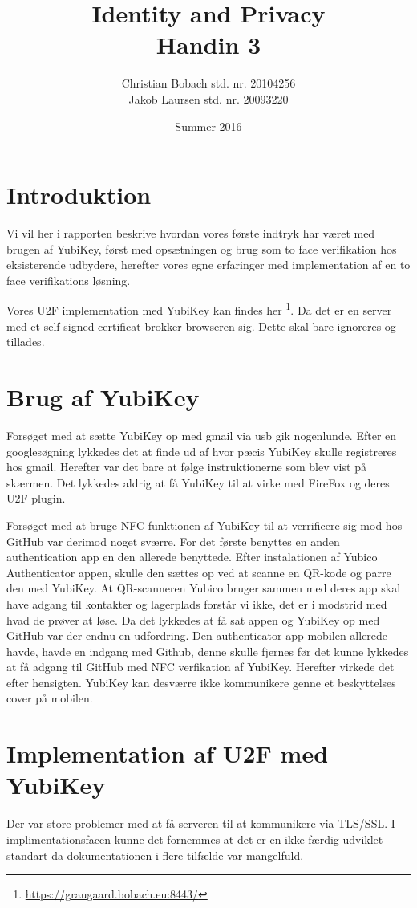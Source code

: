 \documentclass[a4paper,12pt]{article}
\title{Identity and Privacy \\Handin 3}
\author{Christian Bobach std. nr. 20104256\\Jakob Laursen std. nr. 20093220}
\date{Summer 2016}
\theoremstyle{plain}
\theoremstyle{nonumberplain}
\begin{document}
\maketitle
\section*{Introduktion}
Vi vil her i rapporten beskrive hvordan vores første indtryk har været med brugen af YubiKey, først med opsætningen og brug som to face verifikation hos eksisterende udbydere, herefter vores egne erfaringer med implementation af en to face verifikations løsning.

Vores U2F implementation med YubiKey kan findes her \footnote{\url{https://graugaard.bobach.eu:8443/}}. Da det er en server med et self signed certificat brokker browseren sig. Dette skal bare ignoreres og tillades.

\section*{Brug af YubiKey}
Forsøget med at sætte YubiKey op med gmail via usb gik nogenlunde. Efter en googlesøgning lykkedes det at finde ud af hvor pæcis YubiKey skulle registreres hos gmail. Herefter var det bare at følge instruktionerne som blev vist på skærmen. Det lykkedes aldrig at få YubiKey til at virke med FireFox og deres U2F plugin.

Forsøget med at bruge NFC funktionen af YubiKey til at verrificere sig mod hos GitHub var derimod noget sværre. For det første benyttes en anden authentication app en den allerede benyttede. Efter instalationen af Yubico Authenticator appen, skulle den sættes op ved at scanne en QR-kode og parre den med YubiKey. At QR-scanneren Yubico bruger sammen med deres app skal have adgang til kontakter og lagerplads forstår vi ikke, det er i modstrid med hvad de prøver at løse. Da det lykkedes at få sat appen og YubiKey op med GitHub var der endnu en udfordring. Den authenticator app mobilen allerede havde, havde en indgang med Github, denne skulle fjernes før det kunne lykkedes at få adgang til GitHub med NFC verfikation af YubiKey. Herefter virkede det efter hensigten. YubiKey kan desværre ikke kommunikere genne et beskyttelses cover på mobilen.

\section*{Implementation af U2F med YubiKey}
Der var store problemer med at få serveren til at kommunikere via TLS/SSL. I implimentationsfacen kunne det fornemmes at det er en ikke færdig udviklet standart da dokumentationen i flere tilfælde var mangelfuld.
\end{document}
